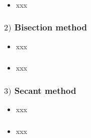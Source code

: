 \documentclass[english,14pt]{beamer}
\begin{document}
\begin{frame}[fragile]

\frametitle{}

\begin{itemize}
	\item xxx
\end{itemize}

\end{frame}


\begin{frame}[fragile]

\frametitle{$2)$ Bisection method}

\begin{itemize}
	\item xxx
\end{itemize}

\end{frame}


\begin{frame}[fragile]

\frametitle{}

\begin{itemize}
	\item xxx
\end{itemize}

\end{frame}


\begin{frame}[fragile]

\frametitle{$3)$ Secant method}

\begin{itemize}
	\item xxx
\end{itemize}

\end{frame}


\begin{frame}[fragile]

\frametitle{}

\begin{itemize}
	\item xxx
\end{itemize}

\end{frame}
\end{document}
